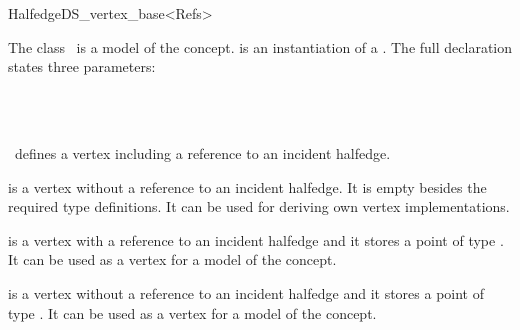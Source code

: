 
\ccRefPageBegin



\begin{ccRefClass}{HalfedgeDS_vertex_base<Refs>}

\ccDefinition
  
The class \ccRefName\ is a model of the 
concept.  is an instantiation of a . 
The full declaration states three parameters:

~~~~~~\\
\mbox{}~~~~~~

\ccRefName\ defines a vertex including a reference to an incident halfedge.

 is a vertex
without a reference to an incident halfedge. It is empty besides the
required type definitions. It can be used for deriving own vertex
implementations.

 is a vertex
with a reference to an incident halfedge and it stores a point of type
.  It can be used as a vertex for a model of the
 concept.

 is a vertex
without a reference to an incident halfedge and it stores a point of
type .  It can be used as a vertex for a model of the
 concept.


\ccIsModel


\ccTypes
{}
\ccThreeToTwo



\end{ccRefClass}
